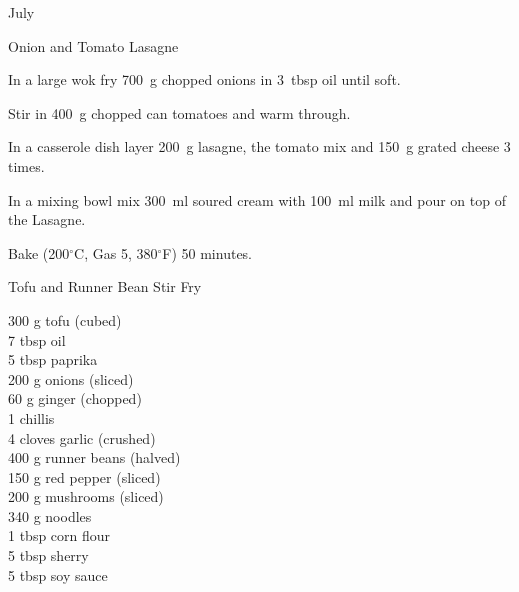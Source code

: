 \begin{menu}{July}
\begin{recipe}{2}{Onion and Tomato Lasagne}
\begin{ingredients}
		\end{ingredients}
	
	
	
    \begin{instructions}
    \item 
        In a large wok fry
        700~g chopped onions
        in
        3~tbsp  oil
        until soft.
      \item 
        Stir in 400~g chopped can tomatoes
        and warm through.
      \item 
        In a casserole dish layer
        200~g  lasagne,
        the tomato mix and
        150~g grated cheese
        3 times.
      \item 
        In a mixing bowl mix
        300~ml  soured cream
        with
        100~ml  milk
        and pour on top of the Lasagne.
      \item 
        Bake (200$^{\circ}$C, Gas 5, 380$^{\circ}$F) 50 minutes.
      
    \end{instructions}
    \end{recipe}%
  
    \begin{recipe}{2}{Tofu and Runner Bean Stir Fry}%
		\begin{ingredients}
		300 g tofu (cubed) \\
	7 tbsp oil  \\
	5 tbsp paprika  \\
	200 g onions (sliced) \\
	60 g ginger (chopped) \\
	1  chillis  \\
	4 cloves garlic (crushed) \\
	400 g runner beans (halved) \\
	150 g red pepper (sliced) \\
	200 g mushrooms (sliced) \\
	340 g noodles  \\
	1 tbsp corn flour  \\
	5 tbsp sherry  \\
	5 tbsp soy sauce  \\
	
		\end{ingredients}
	
	

\end{recipe}
\end{menu}
